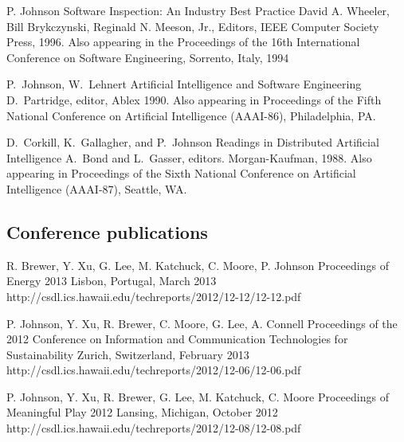 \documentclass[11pt,letterpaper,sans]{moderncv} %
\begin{document}
          {P. Johnson}
          {Software Inspection:  An Industry Best Practice}  
          {David A. Wheeler, Bill Brykczynski, Reginald N. Meeson, Jr., Editors, IEEE Computer Society Press, 1996.
          Also appearing in the Proceedings of the 16th International Conference on Software Engineering, Sorrento, Italy, 1994}

          {P.~Johnson, W.~Lehnert}
          {Artificial Intelligence and Software Engineering}
          {D.~Partridge, editor, Ablex 1990. Also appearing in Proceedings of the Fifth National Conference on
  Artificial Intelligence (AAAI-86), Philadelphia, PA.}

          {D.~Corkill, K.~Gallagher, and P.~Johnson}
          {Readings in Distributed Artificial Intelligence}
          {A.~Bond and L.~Gasser, editors.  Morgan-Kaufman, 1988.  Also appearing in Proceedings of the Sixth National Conference on Artificial Intelligence (AAAI-87), Seattle, WA.}

\subsection{Conference publications}

          {R. Brewer, Y. Xu, G. Lee, M. Katchuck, C. Moore, P. Johnson}
          {Proceedings of Energy 2013}
          {Lisbon, Portugal, March 2013}
          {http://csdl.ics.hawaii.edu/techreports/2012/12-12/12-12.pdf}

          {P. Johnson, Y. Xu, R. Brewer,  C. Moore,  G. Lee, A. Connell}
          {Proceedings of the 2012 Conference on Information and Communication Technologies for Sustainability}
          {Zurich, Switzerland, February 2013}
          {http://csdl.ics.hawaii.edu/techreports/2012/12-06/12-06.pdf}

          {P. Johnson, Y. Xu, R. Brewer, G. Lee, M. Katchuck, C. Moore}
          {Proceedings of Meaningful Play 2012}
          {Lansing, Michigan, October 2012}
          {http://csdl.ics.hawaii.edu/techreports/2012/12-08/12-08.pdf}
\end{document}
